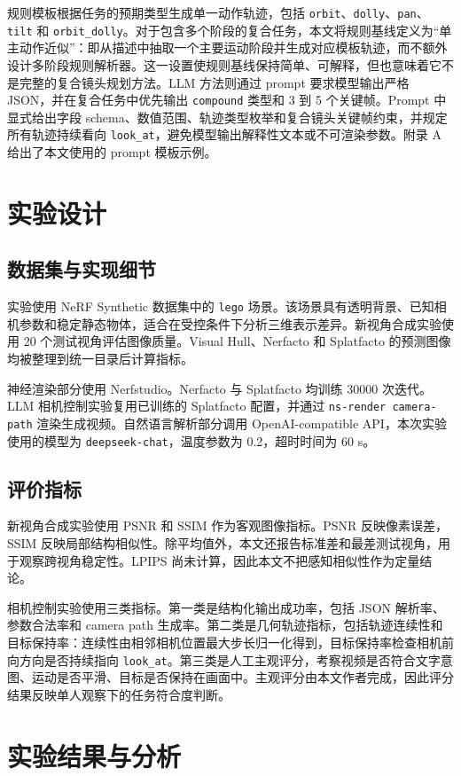 \documentclass[a4paper, 12pt, centering]{article}
\begin{document}
规则模板根据任务的预期类型生成单一动作轨迹，包括 \texttt{orbit}、\texttt{dolly}、\texttt{pan}、\texttt{tilt} 和 \texttt{orbit\_dolly}。对于包含多个阶段的复合任务，本文将规则基线定义为“单主动作近似”：即从描述中抽取一个主要运动阶段并生成对应模板轨迹，而不额外设计多阶段规则解析器。这一设置使规则基线保持简单、可解释，但也意味着它不是完整的复合镜头规划方法。LLM 方法则通过 prompt 要求模型输出严格 JSON，并在复合任务中优先输出 \texttt{compound} 类型和 3 到 5 个关键帧。Prompt 中显式给出字段 schema、数值范围、轨迹类型枚举和复合镜头关键帧约束，并规定所有轨迹持续看向 \texttt{look\_at}，避免模型输出解释性文本或不可渲染参数。附录 A 给出了本文使用的 prompt 模板示例。

\section{实验设计}
\subsection{数据集与实现细节}
实验使用 NeRF Synthetic 数据集中的 \texttt{lego} 场景。该场景具有透明背景、已知相机参数和稳定静态物体，适合在受控条件下分析三维表示差异。新视角合成实验使用 20 个测试视角评估图像质量。Visual Hull、Nerfacto 和 Splatfacto 的预测图像均被整理到统一目录后计算指标。

神经渲染部分使用 Nerfstudio。Nerfacto 与 Splatfacto 均训练 30000 次迭代。LLM 相机控制实验复用已训练的 Splatfacto 配置，并通过 \texttt{ns-render camera-path} 渲染生成视频。自然语言解析部分调用 OpenAI-compatible API，本次实验使用的模型为 \texttt{deepseek-chat}，温度参数为 0.2，超时时间为 60 s。

\subsection{评价指标}
新视角合成实验使用 PSNR 和 SSIM 作为客观图像指标。PSNR 反映像素误差，SSIM 反映局部结构相似性。除平均值外，本文还报告标准差和最差测试视角，用于观察跨视角稳定性。LPIPS 尚未计算，因此本文不把感知相似性作为定量结论。

相机控制实验使用三类指标。第一类是结构化输出成功率，包括 JSON 解析率、参数合法率和 camera path 生成率。第二类是几何轨迹指标，包括轨迹连续性和目标保持率：连续性由相邻相机位置最大步长归一化得到，目标保持率检查相机前向方向是否持续指向 \texttt{look\_at}。第三类是人工主观评分，考察视频是否符合文字意图、运动是否平滑、目标是否保持在画面中。主观评分由本文作者完成，因此评分结果反映单人观察下的任务符合度判断。

\section{实验结果与分析}
\end{document}
